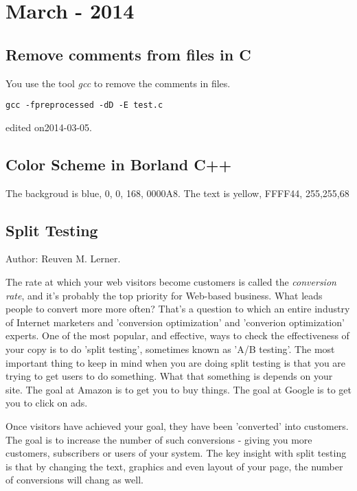 
\chapter[March - 2014]{March - 2014} %

\label{ch:mar:2014} %

\section{Remove comments from files in C}
You use the tool {\it gcc} to remove the comments in files.
\begin{verbatim}
gcc -fpreprocessed -dD -E test.c
\end{verbatim}

\hfill {\tiny edited on2014-03-05.}

\section{Color Scheme in Borland C++}
The backgroud is blue, 0, 0, 168, 0000A8.
The text is yellow, FFFF44, 255,255,68

\section{Split Testing}
Author: Reuven M. Lerner.

The rate at which your web visitors become customers 
is called the {\it conversion rate}, 
and it's probably the top priority for Web-based 
business.
What leads people to convert more more often?
That's a question to which an entire industry of
Internet marketers and 'conversion optimization' and
'converion optimization' experts.
One of the most popular, and effective, ways to check
the effectiveness of your copy is to do 'split testing', 
sometimes known as 'A/B testing'.
The most important thing to keep in mind when you are
doing split testing is that you are trying to get users
to do something. What that something is depends on your site.
The goal at Amazon is to get you to buy things.
The goal at Google is to get you to click on ads.

Once visitors have achieved your goal, 
they have been 'converted' into customers.
The goal is to increase the number of such conversions
- giving you more customers, subscribers or users of your system.
The key insight with split testing is that by changing
the text, graphics and even layout of your page,
the number of conversions will chang as well.

